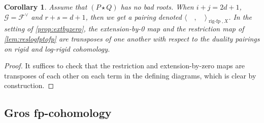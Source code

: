 \documentclass[cjm]{ipart}
\theoremstyle{plain}
\newtheorem{corollary}[theorem]{Corollary}
\theoremstyle{remark}
\DeclareMathOperator{\lrigfp}{lrig-fp}
\DeclareMathOperator{\lrigsyn}{lrig-syn}
\DeclareMathOperator{\rigfp}{rig-fp}
\DeclareMathOperator{\tr}{tr}
\newcommand{\QQ}{\mathbf{Q}}
\newcommand{\Qp}{\QQ_p}
\newcommand{\rig}{\mathrm{rig}}
\newcommand{\sF}{\mathscr{F}}
\newcommand{\sG}{\mathscr{G}}
\numberwithin{equation}{subsection}
\begin{document}
%
%

  \begin{corollary}\label{cor:rigfppairing}
   Assume that $(P\star Q)$ has no bad roots. When $i+j=2d+1$, $\sG=\sF^\vee$ and $r+s=d+1$, then we get a pairing denoted  $\langle\quad,\quad\rangle_{\rigfp,X}$. In the setting of \cref{prop:extbyzero}, the extension-by-0 map and the restriction map of \ref{lem:reslogfptofp} are transposes of one another with respect to the duality pairings on rigid and log-rigid cohomology.
  \end{corollary}

  \begin{proof}
   It suffices to check that the restriction and extension-by-zero maps are transposes of each other on each term in the defining diagrams, which is clear by construction.
  \end{proof}





\subsection{Gros fp-cohomology}
\end{document}
